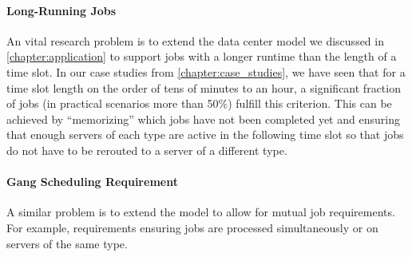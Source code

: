 \paragraph{Long-Running Jobs} An vital research problem is to extend the data center model we discussed in \cref{chapter:application} to support jobs with a longer runtime than the length of a time slot. In our case studies from \cref{chapter:case_studies}, we have seen that for a time slot length on the order of tens of minutes to an hour, a significant fraction of jobs (in practical scenarios more than 50\%) fulfill this criterion. This can be achieved by ``memorizing'' which jobs have not been completed yet and ensuring that enough servers of each type are active in the following time slot so that jobs do not have to be rerouted to a server of a different type.

\paragraph{Gang Scheduling Requirement} A similar problem is to extend the model to allow for mutual job requirements. For example, requirements ensuring jobs are processed simultaneously or on servers of the same type.
